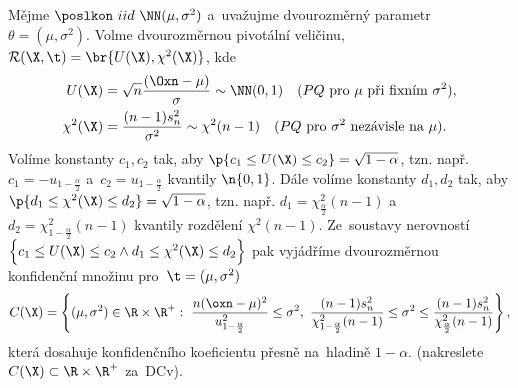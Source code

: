 \begin{example}
Mějme $\poslkon~iid~\NN(\mu,\sigma^2)$ a~uvažujme dvourozměrný parametr $\theta=(\mu,\sigma^2)$. Volme dvourozměrnou pivotální veličinu,\\ $\mathcal{R}(\X,\t)=\br{U(\X),\chi^2(\X)}$, kde \[
\begin{split}
U(\X)&= \sqrt{n}\frac{(\Oxn-\mu)}{\sigma}\sim\NN(0,1)\quad (PQ\text{ pro~}\mu\text{ při~fixním }\sigma^2), \\
\chi^2(\X)&=\frac{(n-1)s_n^2}{\sigma^2}\sim\chi^2(n-1)\quad (PQ\text{ pro~}\sigma^2\text{ nezávisle na~}\mu).
\end{split}
\]
Volíme konstanty $c_1,c_2$ tak, aby $\p{c_1\leq U(\X)\leq c_2}=\sqrt{1-\alpha}$, tzn. např. $c_1=-u_{1-\frac{\alpha}{2}}$ a~$c_2=u_{1-\frac{\alpha}{2}}$ kvantily $\n{0,1}$. Dále volíme konstanty $d_1,d_2$ tak, aby $\p{d_1\leq \chi^2(\X)\leq d_2}=\sqrt{1-\alpha}$, tzn. např. $d_1=\chi^2_{\frac{\alpha}{2}}(n-1)$ a~$d_2=\chi^2_{1-\frac{\alpha}{2}}(n-1)$ kvantily rozdělení $\chi^2(n-1)$. Ze~soustavy nerovností $\Big\{ c_1\leq U(\X)\leq c_2 \wedge d_1\leq\chi^2(\X)\leq d_2 \Big\}$ pak vyjádříme dvourozměrnou konfidenční množinu pro~$\t=(\mu,\sigma^2)$
$$ C(\X)=\left\{ (\mu,\sigma^2)\in\R\times\R^+:~\frac{n(\oxn-\mu)^2}{u^2_{1-\frac{\alpha}{2}}}\leq \sigma^2,~\frac{(n-1)s_n^2}{\chi^2_{1-\frac{\alpha}{2}}(n-1)}\leq \sigma^2\leq \frac{(n-1)s_n^2}{\chi^2_{\frac{\alpha}{2}}(n-1)} \right\}, $$
která dosahuje konfidenčního koeficientu přesně na~hladině $1-\alpha$. (nakreslete $C(\X)\subset\R\times\R^+$ za~DCv).
\end{example}

